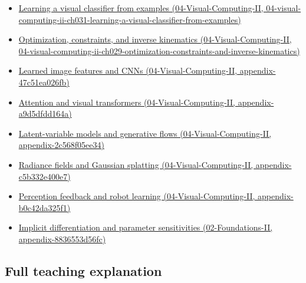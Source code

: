 \begin{itemize}
\tightlist
\item
  \href{../04-Visual-Computing-II/main.pdf\#nameddest=04-visual-computing-ii-ch031-learning-a-visual-classifier-from-examples}{Learning a visual classifier from examples (04-Visual-Computing-II, 04-visual-computing-ii-ch031-learning-a-visual-classifier-from-examples)}
\item
  \href{../04-Visual-Computing-II/main.pdf\#nameddest=04-visual-computing-ii-ch029-optimization-constraints-and-inverse-kinematics}{Optimization, constraints, and inverse kinematics (04-Visual-Computing-II, 04-visual-computing-ii-ch029-optimization-constraints-and-inverse-kinematics)}
\item
  \href{../04-Visual-Computing-II/main.pdf\#nameddest=appendix-47c51ea026fb}{Learned image features and CNNs (04-Visual-Computing-II, appendix-47c51ea026fb)}
\item
  \href{../04-Visual-Computing-II/main.pdf\#nameddest=appendix-a9d5dfdd164a}{Attention and visual transformers (04-Visual-Computing-II, appendix-a9d5dfdd164a)}
\item
  \href{../04-Visual-Computing-II/main.pdf\#nameddest=appendix-2c568f05ee34}{Latent-variable models and generative flows (04-Visual-Computing-II, appendix-2c568f05ee34)}
\item
  \href{../04-Visual-Computing-II/main.pdf\#nameddest=appendix-c5b332e400e7}{Radiance fields and Gaussian splatting (04-Visual-Computing-II, appendix-c5b332e400e7)}
\item
  \href{../04-Visual-Computing-II/main.pdf\#nameddest=appendix-b0c42da325f1}{Perception feedback and robot learning (04-Visual-Computing-II, appendix-b0c42da325f1)}
\item
  \href{../02-Foundations-II/main.pdf\#nameddest=appendix-8836553d56fc}{Implicit differentiation and parameter sensitivities (02-Foundations-II, appendix-8836553d56fc)}
\end{itemize}

\subsection{Full teaching explanation}\label{appendix-40df0855b4a7-full-teaching-explanation}

